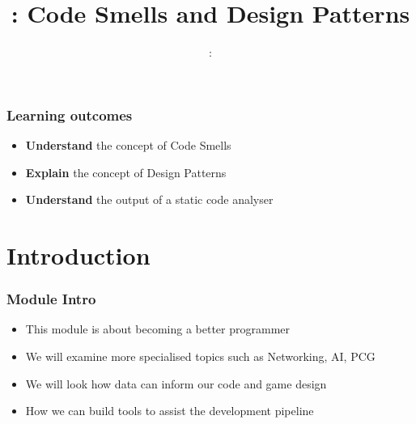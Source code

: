 \usepackage{../../beamerthemeFalmouthGamesAcademy}
\usepackage{multimedia}
\graphicspath{ {../../} }


\usepackage[normalem]{ulem}
\usepackage{wasysym}

\usepackage{pdfpages}

\usetikzlibrary{arrows,automata}




\title{\sessionnumber: Code Smells and Design Patterns}
\subtitle{\modulecode: \moduletitle}

\frame{\titlepage} 

\begin{frame}
	\frametitle{Learning outcomes}
	\begin{itemize}
		\item \textbf{Understand} the concept of Code Smells
		\item \textbf{Explain} the concept of Design Patterns
		\item \textbf{Understand} the output of a static code analyser
	\end{itemize}
\end{frame}

\section{Introduction}

\begin{frame}
	\frametitle{Module Intro}
	\begin{itemize}
		\item This module is about becoming a better programmer
		\item We will examine more specialised topics such as Networking, AI, PCG
		\item We will look how data can inform our code and game design
		\item How we can build tools to assist the development pipeline
	\end{itemize}
\end{frame}

